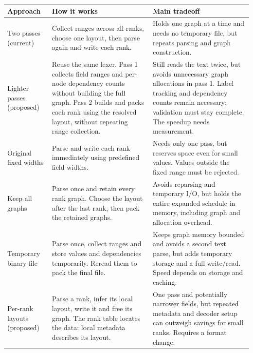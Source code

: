 \documentclass[10pt,a4paper]{article}
\begin{document}
\par\medskip\noindent\begin{minipage}{\linewidth}
\small\renewcommand{\arraystretch}{1.15}
\begin{tabular}{P{0.19\dimexpr{}\tabcolsep\relax}P{0.39\dimexpr{}\tabcolsep\relax}P{0.42\dimexpr{}\tabcolsep\relax}}
\toprule
\textbf{Approach} & \textbf{How it works} & \textbf{Main tradeoff} \\
\midrule
Two passes (current) & Collect ranges across all ranks, choose one layout, then parse again and write each rank. & Holds one graph at a time and needs no temporary file, but repeats parsing and graph construction. \\
Lighter passes (proposed) & Reuse the same lexer. Pass 1 collects field ranges and per-node dependency counts without building the full graph. Pass 2 builds and packs each rank using the resolved layout, without repeating range collection. & Still reads the text twice, but avoids unnecessary graph allocations in pass 1. Label tracking and dependency counts remain necessary; validation must stay complete. The speedup needs measurement. \\
Original fixed widths & Parse and write each rank immediately using predefined field widths. & Needs only one pass, but reserves space even for small values. Values outside the fixed range must be rejected. \\
Keep all graphs & Parse once and retain every rank graph. Choose the layout after the last rank, then pack the retained graphs. & Avoids reparsing and temporary I/O, but holds the entire expanded schedule in memory, including graph and allocation overhead. \\
Temporary binary file & Parse once, collect ranges and store values and dependencies temporarily. Reread them to pack the final file. & Keeps graph memory bounded and avoids a second text parse, but adds temporary storage and a full write/read. Speed depends on storage and caching. \\
Per-rank layouts (proposed) & Parse a rank, infer its local layout, write it and free its graph. The rank table locates the data; local metadata describes its layout. & One pass and potentially narrower fields, but repeated metadata and decoder setup can outweigh savings for small ranks. Requires a format change. \\
\bottomrule
\end{tabular}
\end{minipage}\par\medskip
\end{document}
